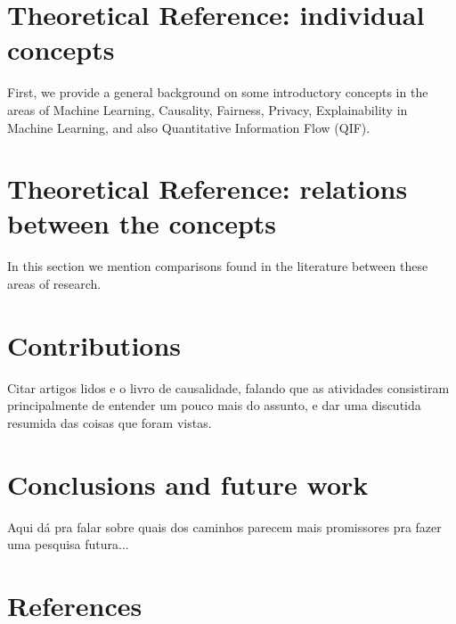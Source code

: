 \documentclass{article}
\begin{document}
\section{Theoretical Reference: individual concepts}\label{sec:theoRef1}

First, we provide a general background on some introductory concepts in the areas of Machine Learning, Causality, Fairness, Privacy, Explainability in Machine Learning, and also Quantitative Information Flow (QIF).



\section{Theoretical Reference: relations between the concepts}\label{sec:theoRef2}

In this section we mention comparisons found in the literature between these areas of research.



\section{Contributions}\label{sec:contribs}

{\color{red} Citar artigos lidos e o livro de causalidade, falando que as atividades consistiram principalmente de entender um pouco mais do assunto, e dar uma discutida resumida das coisas que foram vistas.}

\section{Conclusions and future work}\label{sec:concsFuture}

{\color{red} Aqui dá pra falar sobre quais dos caminhos parecem mais promissores pra fazer uma pesquisa futura...}

\section{References}




\end{document}
